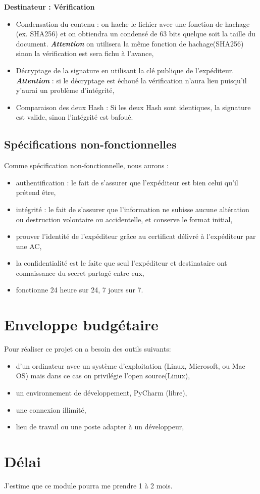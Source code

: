 \documentclass[12pt,a4paper]{article}
\begin{document}
\begin{enumerate}
			\textbf{Destinateur : Vérification}\\
			\begin{itemize}
				\item Condensation du contenu : on hache le fichier avec une fonction de hachage (ex. SHA256) et on obtiendra un condensé de 63 bits quelque soit la taille du document. \emph{\textbf{Attention}} on utilisera la même fonction de hachage(SHA256) sinon la vérification est sera fichu à l'avance,
				\item Décryptage de la signature en utilisant la clé publique de l'expéditeur. \emph{\textbf{Attention}} : si le décryptage est échoué la vérification n'aura lieu puisqu'il y'aurai un problème d'intégrité,
				\item Comparaison des deux Hash : Si les deux Hash sont identiques, la signature est valide, sinon l'intégrité est bafoué.\\
				
			\end{itemize}
		\end{enumerate}
		
	\subsection{Spécifications non-fonctionnelles}
	Comme spécification non-fonctionnelle, nous aurons :
	\begin{itemize}
		\item authentification : le fait de s'assurer que l'expéditeur est bien celui qu'il prétend être,
		\item intégrité : le fait de s'assurer que l'information ne subisse aucune altération ou destruction volontaire ou accidentelle, et conserve le format initial,
		\item prouver l'identité de l'expéditeur grâce au certificat délivré à l'expéditeur par une AC,
		\item la confidentialité est le faite que seul l'expéditeur et destinataire ont connaissance du secret partagé entre eux,
		\item fonctionne 24 heure sur 24, 7 jours sur 7.
	\end{itemize}

\section{Enveloppe budgétaire}
Pour réaliser ce projet on a besoin des outils suivants:
	\begin{itemize}
		\item d'un ordinateur avec un système d'exploitation (Linux, Microsoft, ou Mac OS) mais dans ce cas on privilégie l'open source(Linux),
		\item un environnement de développement, PyCharm (libre),
		\item une connexion illimité,
		\item lieu de travail ou une poste adapter à un développeur,
		
	\end{itemize}	 

\section{Délai}
	J'estime que ce module pourra me prendre 1 à 2 mois.

\end{document}
